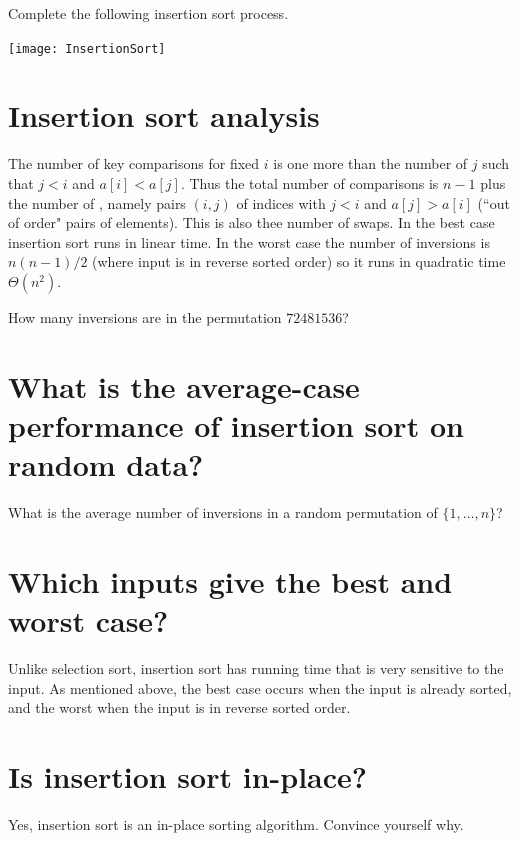 \begin{Boxample}[0]
Complete the following insertion sort process.
\begin{center}
\texttt{[image: InsertionSort]}
\end{center}
\end{Boxample}


\section{Insertion sort analysis}
The number of key comparisons for fixed $i$ is one more than the number of $j$ such that $j < i$ and $a[i] < a[j]$.
Thus the total number of comparisons is $n-1$ plus the number of , 
namely pairs $(i, j)$ of indices with $j < i$ and $a[j] > a[i]$ (``out of order" pairs of elements).
This is also thee number of swaps.
In the best case insertion sort runs in linear time.
In the worst case the number of inversions is $n(n-1)/2$ 
(where input is in reverse sorted order) so it runs in quadratic time $\Theta(n^2)$.

\begin{Boxample}[4]
How many inversions are in the permutation $72481536$?
\end{Boxample}

\section{What is the average-case performance of insertion sort on random data?}

\begin{Boxample}[6]
What is the average number of inversions in a random permutation of $\{1,\dots, n\}$?
\end{Boxample}

\section{Which inputs give the best and worst case?}
Unlike selection sort, insertion sort has running time that is very sensitive to the input. 
As mentioned above, the best case occurs when the input is already sorted, and the worst when the input is in reverse sorted order.

\section{Is insertion sort in-place?}
Yes, insertion sort is an in-place sorting algorithm. Convince yourself why.

